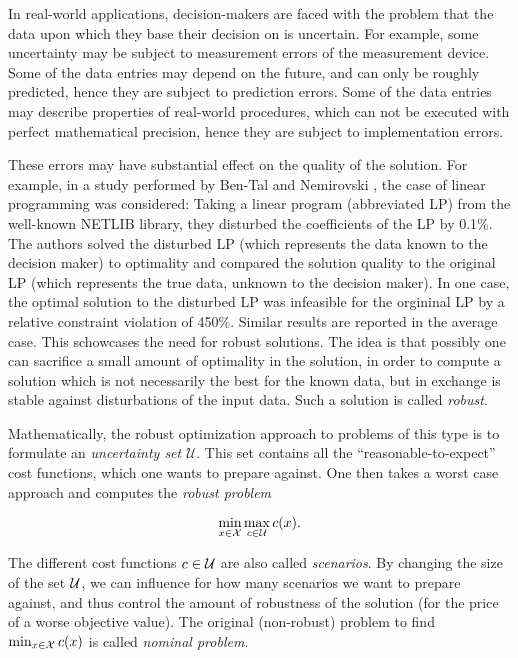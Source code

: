 In real-world applications, decision-makers are faced with the problem that the data upon which they base their decision on is uncertain. For example, some uncertainty may be subject to measurement errors of the measurement device. Some of the data entries may depend on the future, and can only be roughly predicted, hence they are subject to prediction errors. Some of the data entries may describe properties of real-world procedures, which can not be executed with perfect mathematical precision, hence they are subject to implementation errors.

These errors may have substantial effect on the quality of the solution. For example, in a study performed by Ben-Tal and Nemirovski \cite{ben2000robust}, the case of linear programming was considered: 
Taking a linear program (abbreviated LP) from the well-known NETLIB library, they disturbed the coefficients of the LP by 0.1\%. 
The authors solved the disturbed LP (which represents the data known to the decision maker) to optimality and compared the solution quality to the original LP (which represents the true data, unknown to the decision maker). 
In one case, the optimal solution to the disturbed LP was infeasible for the orgininal LP by a relative constraint violation of 450\%. 
Similar results are reported in the average case. This schowcases the need for robust solutions. The idea is that possibly one can sacrifice a small amount of optimality in the solution, in order to compute a solution which is not necessarily the best for the known data, but in exchange is stable against disturbations of the input data. Such a solution is called \emph{robust}.



Mathematically, the robust optimization approach to problems of this type is to formulate an \textit{uncertainty set} $\mathcal{U}$. This set contains all the \enquote{reasonable-to-expect} cost functions, which one wants to prepare against. One then takes a worst case approach and computes the \emph{robust problem}

\[
	\min_{x \in \mathcal{X}} \max_{c \in \mathcal{U}} c(x).
\]

The different cost functions $c \in \mathcal{U}$ are also called \emph{scenarios}. By changing the size of the set $\mathcal{U}$, we can influence for how many scenarios we want to prepare against, and thus control the amount of robustness of the solution (for the price of a worse objective value). The original (non-robust) problem to find $\min_{x \in \mathcal{X}} c(x)$ is called \emph{nominal problem}.

